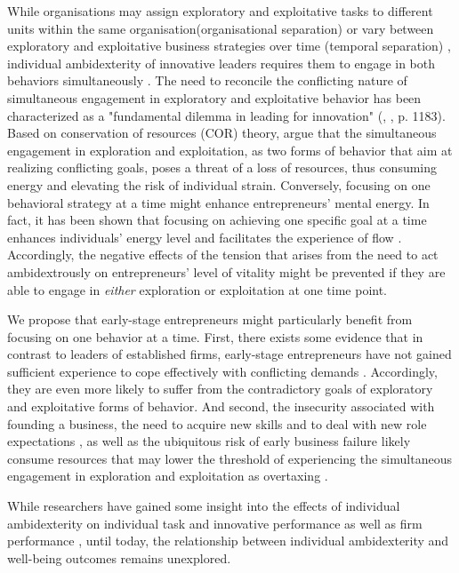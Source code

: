 \documentclass[man, 12pt, a4paper, noextraspace]{apa6}
\begin{document}
While organisations may assign exploratory and exploitative tasks to different units within the same organisation(organisational separation) or vary between exploratory and exploitative business strategies over time (temporal separation) \parencite{Gulati2009}, individual ambidexterity of innovative leaders requires them to engage in both behaviors simultaneously \parencite{Rosing2011, Hunter2017, Rosing.2017}.  
The need to reconcile the conflicting nature of simultaneous engagement in exploratory and exploitative behavior has been characterized as a "fundamental dilemma in leading for innovation" (\citeauthor{Hunter2017}, \citeyear{Hunter2017}, p. 1183). 
Based on conservation of resources (COR) theory, \textcite{Hunter2017} argue that the simultaneous engagement in exploration and exploitation, as two forms of behavior that aim at realizing conflicting goals, poses a threat of a loss of resources, thus consuming energy and elevating the risk of individual strain. 
Conversely, focusing on one behavioral strategy at a time might enhance entrepreneurs' mental energy. 
In fact, it has been shown that focusing on achieving one specific goal at a time enhances individuals' energy level and facilitates the experience of flow \parencite[e.g.,][]{Nielsen2010, Salanova2006}.
Accordingly, the negative effects of the tension that arises from the need to act ambidextrously on entrepreneurs' level of vitality might be prevented if they are able to engage in \textit{either} exploration or exploitation at one time point. \par 
We propose that early-stage entrepreneurs might particularly benefit from focusing on one behavior at a time. 
First, there exists some evidence that in contrast to leaders of established firms, early-stage entrepreneurs have not gained sufficient experience to cope effectively with conflicting demands \parencite{Uy.2013}.
Accordingly, they are even more likely to suffer from the contradictory goals of exploratory and exploitative forms of behavior. 
And second, the insecurity associated with founding a business, the need to acquire new skills and to deal with new role expectations \parencite{Wincent2009a}, as well as the ubiquitous risk of early business failure \parencite{Byrne.2015} likely consume resources that may lower the threshold of experiencing the simultaneous engagement in exploration and exploitation as overtaxing \parencite{Hobfoll.1989}. \par 
While researchers have gained some insight into the effects of individual ambidexterity on individual task and innovative performance \parencite[e.g.,][]{Jasmand.2012, Mom.2015, Rosing.2017} as well as firm performance \parencite[e.g.,][]{Volery.2015, Torres.2015, Vicentini.2019}, until today, the relationship between individual ambidexterity and well-being outcomes remains unexplored. 
\end{document}
